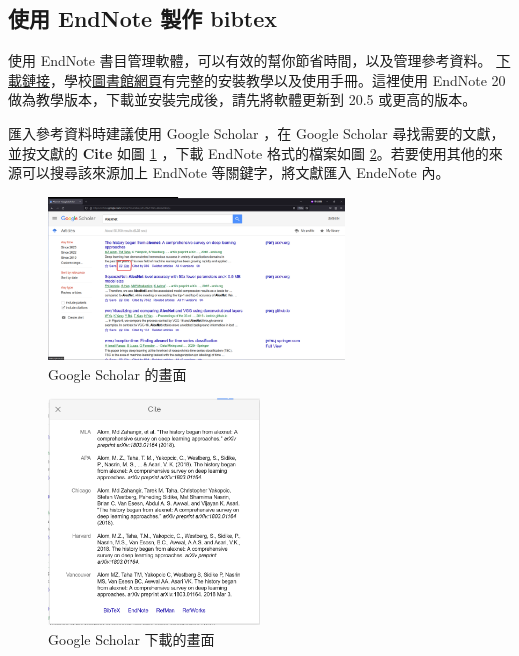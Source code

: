 \subsection*{使用 EndNote 製作 bibtex}

使用 EndNote 書目管理軟體，可以有效的幫你節省時間，以及管理參考資料。 \href{https://www.lib.nkust.edu.tw/portal/portal__bib_mgmt_sw_download.php}{下載鏈接}，學校\href{https://www.lib.nkust.edu.tw/portal/portal__bib_mgmt_sw_1.php?button_num=_bib_mgmt_sw_1}{圖書館網頁}有完整的安裝教學以及使用手冊。這裡使用 EndNote 20 做為教學版本，下載並安裝完成後，請先將軟體更新到 20.5 或更高的版本。

匯入參考資料時建議使用 Google Scholar ，在 Google Scholar 尋找需要的文獻，並按文獻的 \textbf{Cite} 如圖 \ref{fig_google_scholar} ，下載 EndNote 格式的檔案如圖 \ref{fig_google_scholar_download}。若要使用其他的來源可以搜尋該來源加上 EndNote 等關鍵字，將文獻匯入 EndeNote 內。

\begin{figure}[H] 
    \centering 
    \includegraphics[width=0.7\textwidth]{Figures/Endnote/googleScholar.png} 
    \caption{Google Scholar 的畫面}
    \label{fig_google_scholar}
\end{figure}

\begin{figure}[H] 
    \centering 
    \includegraphics[width=0.5\textwidth]{Figures/Endnote/googleScholarDownload.png} 
    \caption{Google Scholar 下載的畫面}
    \label{fig_google_scholar_download}
\end{figure}


